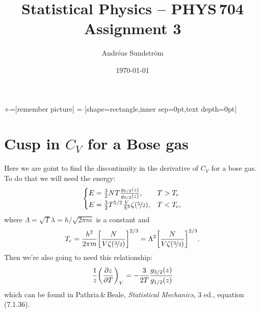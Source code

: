 \documentclass[11pt,letter, swedish, english
]{article}
\renewcommand{\thesubsection}{\arabic{section} (\alph{subsection})}
\begin{document}
+=[remember picture]
 = [shape=rectangle,inner sep=0pt,text depth=0pt]




\title{Statistical Physics -- PHYS\,704 \\
Assignment 3}
\author{Andréas Sundström}
\date{\today}

\maketitle


\newcommand{\Tc}{\ensuremath{T_{\text{c}}}}

\section{Cusp in $C_V$ for a Bose gas}
\renewcommand{\thesubsection}{\arabic{section} (\roman{subsection})}
Here we are goint to find the discontinuity in the derivative of $C_V$
for a bose gas. To do that we will need the energy:
\begin{equation}\label{eq:1_E}
\begin{cases}
E=\frac{3}{2}NT\frac{g_{5/2}(z)}{g_{3/2}(z)}, \quad& T>\Tc\\
E=\frac{3}{2}T^{5/2}\frac{V}{\Lambda^3}\zeta(\nicefrac{5}{2}), &T<\Tc,
\end{cases}
\end{equation}
where $\Lambda=\sqrt{T}\lambda=h/\sqrt{2\pi m}$ is a constant and
\begin{equation}
\Tc=\frac{h^2}{2\pi m}\qty[\frac{N}{V\zeta(\nicefrac{3}{2})}]^{2/3}
=\Lambda^2\qty[\frac{N}{V\zeta(\nicefrac{3}{2})}]^{2/3}.
\end{equation}
Then we're also going to need this relationship:
\begin{equation}\label{eq:1_dz}
\frac{1}{z}\qty(\pdv{z}{T})_V
=-\frac{3}{2T}\frac{g_{3/2}(z)}{g_{1/2}(z)}
\end{equation}
which can be found in Pathria\,\&\,Beale, \textit{Statistical
  Mechanics}, 3 ed., equation (7.1.36).
\end{document}
